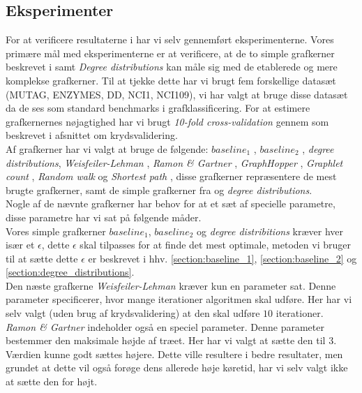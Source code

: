 \documentclass{article}
\begin{document}
\subsection{Eksperimenter}
For at verificere resultaterne i \cite{trivial-kernels} har vi selv gennemført eksperimenterne.
Vores primære mål med eksperimenterne er at verificere, at de to simple grafkerner beskrevet i \cite{trivial-kernels} samt \textit{Degree distributions} kan måle sig med de etablerede og mere komplekse grafkerner. Til at tjekke dette har vi brugt fem forskellige datasæt (MUTAG, ENZYMES, DD, NCI1, NCI109), vi har valgt at bruge disse datasæt da de ses som standard benchmarks i grafklassificering. For at estimere grafkernernes nøjagtighed har vi brugt \textit{10-fold cross-validation} gennem \cite{libsvm} som beskrevet i afsnittet om krydsvalidering. \\
Af grafkerner har vi valgt at bruge de følgende: $baseline_1$ \cite{trivial-kernels}, $baseline_2$ \cite{trivial-kernels}, \textit{degree distributions}, \textit{Weisfeiler-Lehman} \cite{WL}, \textit{Ramon \& Gartner} \cite{RG},  \textit{GraphHopper} \cite{graphhopper}, \textit{Graphlet count} \cite{GC}, \textit{Random walk} \cite{RW} og \textit{Shortest path} \cite{shortest-path}, disse grafkerner repræsentere de mest brugte grafkerner, samt de simple grafkerner fra \cite{trivial-kernels} og \textit{degree distributions}. \\
Nogle af de nævnte grafkerner har behov for at et sæt af specielle parametre, disse parametre har vi sat på følgende måder.\\
Vores simple grafkerner $baseline_1$, $baseline_2$ og \textit{degree distribitions} kræver hver især et $\epsilon$, dette $\epsilon$ skal tilpasses for at finde det mest optimale, metoden vi bruger til at sætte dette $\epsilon$ er beskrevet i hhv. \ref{section:baseline_1}, \ref{section:baseline_2} og \ref{section:degree_distributions}.\\
Den næste grafkerne \textit{Weisfeiler-Lehman} kræver kun en parameter sat. Denne parameter specificerer, hvor mange iterationer algoritmen skal udføre. Her har vi selv valgt (uden brug af krydsvalidering) at den skal udføre $10$ iterationer. \\
\textit{Ramon \& Gartner} indeholder også en speciel parameter. Denne parameter bestemmer den maksimale højde af træet. Her har vi valgt at sætte den til $3$. Værdien kunne godt sættes højere. Dette ville resultere i bedre resultater, men grundet at dette vil også forøge dens allerede høje køretid, har vi selv valgt ikke at sætte den for højt. \\
\end{document}
